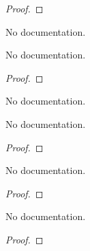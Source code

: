 \begin{proof}
    \leanok
\end{proof}

\begin{definition}\label{Nesterov_first_fix_stepsize}
        \leanok
                No documentation.
    \end{definition}

\begin{theorem}\label{Nesterov_first_fix_stepsize_converge}
        \leanok
                No documentation.
    \end{theorem}

\begin{proof}
    \leanok
\end{proof}

\begin{definition}\label{Nesterov}
        \leanok
                No documentation.
    \end{definition}

\begin{lemma}\label{one_iter}
        \leanok
                No documentation.
    \end{lemma}

\begin{proof}
    \leanok
\end{proof}

\begin{theorem}\label{nesterov_algorithm_smooth}
        \leanok
                No documentation.
    \end{theorem}

\begin{proof}
    \leanok
\end{proof}

\begin{lemma}\label{dot_mul_eq_transpose_mul_dot}
        \leanok
                No documentation.
    \end{lemma}

\begin{proof}
    \leanok
\end{proof}

